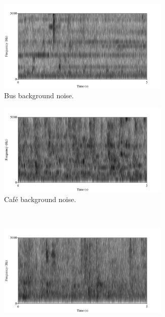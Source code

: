 \begin{figure}[h!]
\begin{subfigure}{0.475\linewidth}
  \centering
  \includegraphics[width=0.9\textwidth]{figure/spctgrm-bus-background.png}
  \caption{Bus background noise.}
  \label{fig:bus-bkgrnd}
\end{subfigure}
\qquad
\begin{subfigure}{0.475\linewidth}
  \centering
  \includegraphics[width=0.9\textwidth]{figure/spctgrm-cafe-background.png}
  \caption{Caf\'{e} background noise.}
  \label{fig:cafe-bkgrnd}
\end{subfigure}%
\\[2ex]
\begin{subfigure}{0.475\linewidth}
  \centering
  \includegraphics[width=0.9\textwidth]{figure/spctgrm-ped-background.png}

\end{subfigure}
\end{figure}
